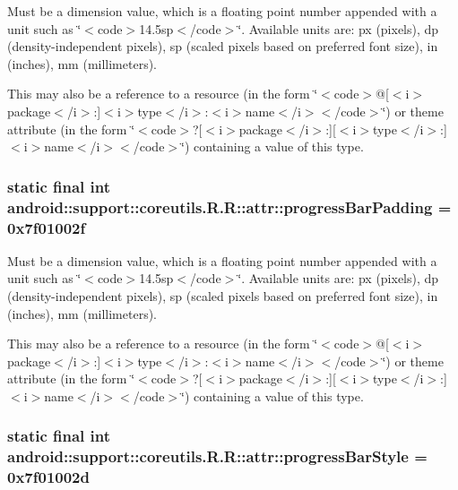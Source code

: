 Must be a dimension value, which is a floating point number appended with a unit such as \char`\"{}$<$code$>$14.5sp$<$/code$>$\char`\"{}. Available units are: px (pixels), dp (density-independent pixels), sp (scaled pixels based on preferred font size), in (inches), mm (millimeters). 

This may also be a reference to a resource (in the form \char`\"{}$<$code$>$@\mbox{[}$<$i$>$package$<$/i$>$:\mbox{]}$<$i$>$type$<$/i$>$:$<$i$>$name$<$/i$>$$<$/code$>$\char`\"{}) or theme attribute (in the form \char`\"{}$<$code$>$?\mbox{[}$<$i$>$package$<$/i$>$:\mbox{]}\mbox{[}$<$i$>$type$<$/i$>$:\mbox{]}$<$i$>$name$<$/i$>$$<$/code$>$\char`\"{}) containing a value of this type. \hypertarget{classandroid_1_1support_1_1coreutils_1_1_r_1_1attr_8293caa75e2acf7e59f852685af2b698}{
\subsubsection[{progressBarPadding}]{\setlength{\rightskip}{0pt plus 5cm}static final int android::support::coreutils.R.R::attr::progressBarPadding = 0x7f01002f}}
\label{classandroid_1_1support_1_1coreutils_1_1_r_1_1attr_8293caa75e2acf7e59f852685af2b698}


Must be a dimension value, which is a floating point number appended with a unit such as \char`\"{}$<$code$>$14.5sp$<$/code$>$\char`\"{}. Available units are: px (pixels), dp (density-independent pixels), sp (scaled pixels based on preferred font size), in (inches), mm (millimeters). 

This may also be a reference to a resource (in the form \char`\"{}$<$code$>$@\mbox{[}$<$i$>$package$<$/i$>$:\mbox{]}$<$i$>$type$<$/i$>$:$<$i$>$name$<$/i$>$$<$/code$>$\char`\"{}) or theme attribute (in the form \char`\"{}$<$code$>$?\mbox{[}$<$i$>$package$<$/i$>$:\mbox{]}\mbox{[}$<$i$>$type$<$/i$>$:\mbox{]}$<$i$>$name$<$/i$>$$<$/code$>$\char`\"{}) containing a value of this type. \hypertarget{classandroid_1_1support_1_1coreutils_1_1_r_1_1attr_7485e34db433e63ba7a91a98da986226}{
\subsubsection[{progressBarStyle}]{\setlength{\rightskip}{0pt plus 5cm}static final int android::support::coreutils.R.R::attr::progressBarStyle = 0x7f01002d}}
\label{classandroid_1_1support_1_1coreutils_1_1_r_1_1attr_7485e34db433e63ba7a91a98da986226}


